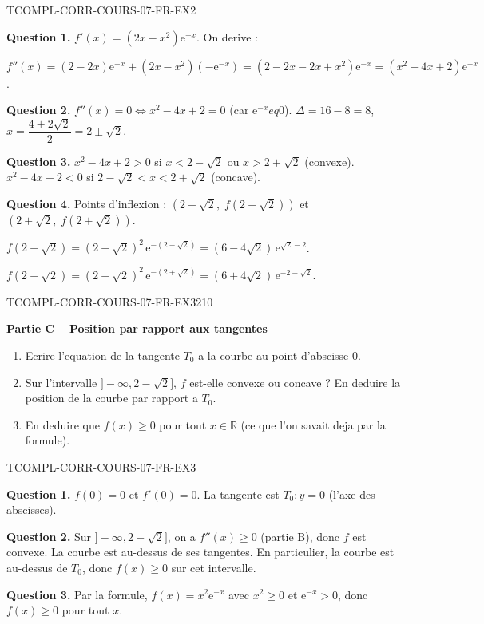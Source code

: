 \begin{corrige}{TCOMPL-CORR-COURS-07-FR-EX2}

\textbf{Question 1.} $f'(x) = (2x - x^2)\mathrm{e}^{-x}$. On derive :

$f''(x) = (2 - 2x)\mathrm{e}^{-x} + (2x - x^2)(-\mathrm{e}^{-x}) = (2 - 2x - 2x + x^2)\mathrm{e}^{-x} = (x^2 - 4x + 2)\mathrm{e}^{-x}$.

\textbf{Question 2.} $f''(x) = 0 \iff x^2 - 4x + 2 = 0$ (car $\mathrm{e}^{-x} 
eq 0$). $\Delta = 16 - 8 = 8$, $x = \dfrac{4 \pm 2\sqrt{2}}{2} = 2 \pm \sqrt{2}$.

\textbf{Question 3.} $x^2 - 4x + 2 > 0$ si $x < 2 - \sqrt{2}$ ou $x > 2 + \sqrt{2}$ (convexe). $x^2 - 4x + 2 < 0$ si $2 - \sqrt{2} < x < 2 + \sqrt{2}$ (concave).

\textbf{Question 4.} Points d'inflexion : $(2 - \sqrt{2},\; f(2-\sqrt{2}))$ et $(2 + \sqrt{2},\; f(2+\sqrt{2}))$.

$f(2-\sqrt{2}) = (2-\sqrt{2})^2\,\mathrm{e}^{-(2-\sqrt{2})} = (6-4\sqrt{2})\,\mathrm{e}^{\sqrt{2}-2}$.

$f(2+\sqrt{2}) = (2+\sqrt{2})^2\,\mathrm{e}^{-(2+\sqrt{2})} = (6+4\sqrt{2})\,\mathrm{e}^{-2-\sqrt{2}}$.

\end{corrige}

\bigskip


\begin{exercice}{TCOMPL-CORR-COURS-07-FR-EX3}{2}{10}

\textbf{Partie C -- Position par rapport aux tangentes}

\begin{enumerate}
  \item Ecrire l'equation de la tangente $T_0$ a la courbe au point d'abscisse $0$.
  \item Sur l'intervalle $]-\infty, 2 - \sqrt{2}]$, $f$ est-elle convexe ou concave ? En deduire la position de la courbe par rapport a $T_0$.
  \item En deduire que $f(x) \geq 0$ pour tout $x \in \mathbb{R}$ (ce que l'on savait deja par la formule).
\end{enumerate}

\end{exercice}

\begin{corrige}{TCOMPL-CORR-COURS-07-FR-EX3}

\textbf{Question 1.} $f(0) = 0$ et $f'(0) = 0$. La tangente est $T_0 : y = 0$ (l'axe des abscisses).

\textbf{Question 2.} Sur $]-\infty, 2 - \sqrt{2}]$, on a $f''(x) \geq 0$ (partie B), donc $f$ est convexe. La courbe est au-dessus de ses tangentes. En particulier, la courbe est au-dessus de $T_0$, donc $f(x) \geq 0$ sur cet intervalle.

\textbf{Question 3.} Par la formule, $f(x) = x^2 \mathrm{e}^{-x}$ avec $x^2 \geq 0$ et $\mathrm{e}^{-x} > 0$, donc $f(x) \geq 0$ pour tout $x$.

\end{corrige}
